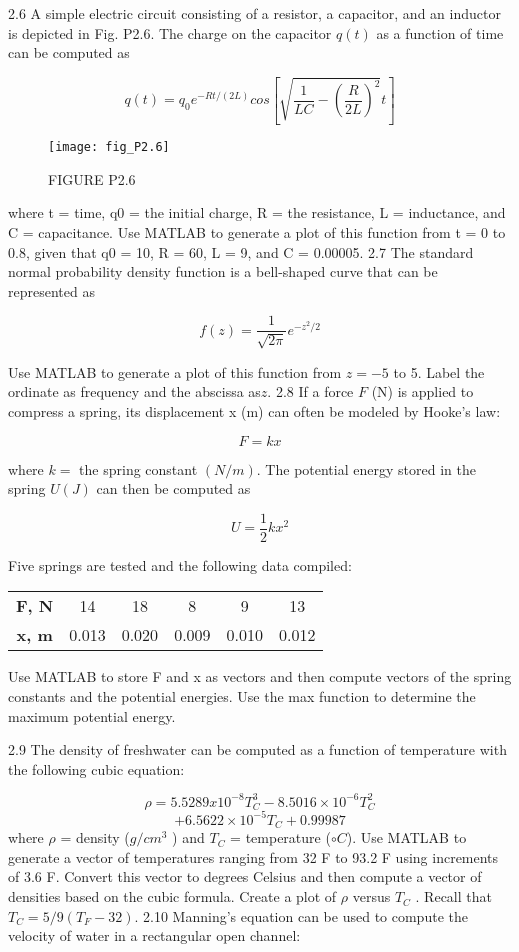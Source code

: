 \documentclass[../main.tex]{subfiles}
\begin{document}
\begin{multicols}{2}
2.6 A simple electric circuit consisting of a resistor, a capacitor, and an inductor is depicted in Fig. P2.6. The charge
on the capacitor $q(t)$ as a function of time can be computed
as

$$q(t)=q_0e^{-Rt/(2L)}cos \left[\sqrt{ \dfrac{1}{LC}-\left(\dfrac{R}{2L} \right)^2 }t\right]$$


\begin{figure}[H]
	\centering
	\texttt{[image: fig\_P2.6]}
   \caption*{\textsf{FIGURE P2.6}}
   \label{fig_P2.6}
\end{figure}

where t = time, q0 = the initial charge, R = the resistance,
L = inductance, and C = capacitance. Use MATLAB to
generate a plot of this function from t = 0 to 0.8, given that
q0 = 10, R = 60, L = 9, and C = 0.00005.
2.7 The standard normal probability density function is a
bell-shaped curve that can be represented as

$$f(z)=\dfrac{1}{\sqrt{2\pi}}e^{-z^2/2} $$

Use MATLAB to generate a plot of this function from
$z = -5$ to 5. Label the ordinate as frequency and the abscissa as$ z$.
2.8 If a force $F$ (N) is applied to compress a spring, its displacement x (m) can often be modeled by Hooke’s law:

$$F=kx $$


where $k =$ the spring constant $(N/m)$. The potential energy
stored in the spring $U (J)$ can then be computed as


$$U=\dfrac{1}{2}kx^2 $$

Five springs are tested and the following data compiled:

\begin{tabular}{cccccc}
	\hline
	\textbf{F, N} &14 &18& 8 &9& 13\\
	\textbf{x, m}& 0.013 &0.020& 0.009& 0.010& 0.012\\
	\hline
	
\end{tabular}
Use MATLAB to store F and x as vectors and then compute
vectors of the spring constants and the potential energies.
Use the max function to determine the maximum potential
energy.


2.9 The density of freshwater can be computed as a function
of temperature with the following cubic equation:


$$ \rho =5.5289x10^{-8}T_C^3-8.5016 \times 10^{-6}T_C^2 $$
$$+6.5622 \times 10^{-5}T_C+0.99987$$
where $\rho$ = density ($g/cm^3$
) and $T_C$ = temperature ($\circ C$). Use
MATLAB to generate a vector of temperatures ranging from
32 F to 93.2 F using increments of 3.6 F. Convert this vector to degrees Celsius and then compute a vector of densities
based on the cubic formula. Create a plot of $\rho$ versus $T_C$ .
Recall that $T_C = 5/9(T_F - 32)$.
2.10 Manning’s equation can be used to compute the velocity of water in a rectangular open channel:



\end{multicols}
\end{document}
